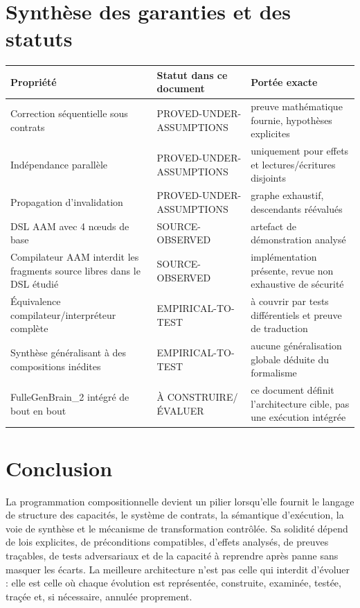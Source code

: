 \documentclass[11pt,a4paper]{article}
\theoremstyle{definition}
\theoremstyle{plain}
\theoremstyle{remark}
\begin{document}
\section{Synthèse des garanties et des statuts}
\begin{longtable}{p{}p{}p{}}
\toprule Propriété & Statut dans ce document & Portée exacte \\
\midrule
Correction séquentielle sous contrats & PROVED-UNDER-ASSUMPTIONS & preuve mathématique fournie, hypothèses explicites \\
Indépendance parallèle & PROVED-UNDER-ASSUMPTIONS & uniquement pour effets et lectures/écritures disjoints \\
Propagation d'invalidation & PROVED-UNDER-ASSUMPTIONS & graphe exhaustif, descendants réévalués \\
DSL AAM avec 4 nœuds de base & SOURCE-OBSERVED & artefact de démonstration analysé \\
Compilateur AAM interdit les fragments source libres dans le DSL étudié & SOURCE-OBSERVED & implémentation présente, revue non exhaustive de sécurité \\
Équivalence compilateur/interpréteur complète & EMPIRICAL-TO-TEST & à couvrir par tests différentiels et preuve de traduction \\
Synthèse généralisant à des compositions inédites & EMPIRICAL-TO-TEST & aucune généralisation globale déduite du formalisme \\
FulleGenBrain\_2 intégré de bout en bout & À CONSTRUIRE/ÉVALUER & ce document définit l'architecture cible, pas une exécution intégrée \\
\bottomrule
\end{longtable}

\section{Conclusion}
La programmation compositionnelle devient un pilier lorsqu'elle fournit le langage de structure des capacités, le système de contrats, la sémantique d'exécution, la voie de synthèse et le mécanisme de transformation contrôlée. Sa solidité dépend de lois explicites, de préconditions compatibles, d'effets analysés, de preuves traçables, de tests adversariaux et de la capacité à reprendre après panne sans masquer les écarts. La meilleure architecture n'est pas celle qui interdit d'évoluer : elle est celle où chaque évolution est représentée, construite, examinée, testée, traçée et, si nécessaire, annulée proprement.
\end{document}
